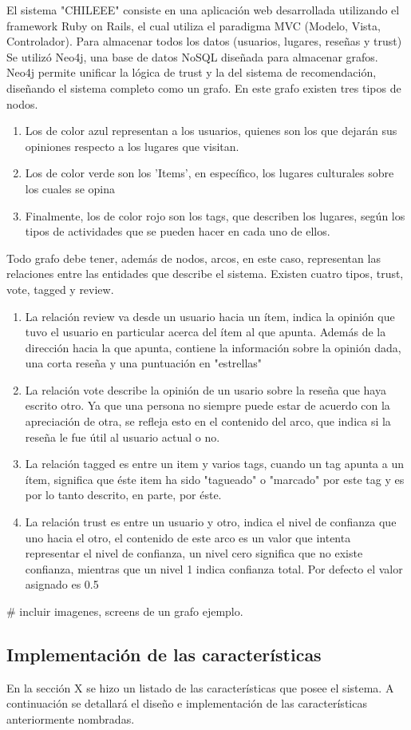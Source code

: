 El sistema "CHILEEE" consiste en una aplicación web desarrollada utilizando el framework Ruby on Rails, el cual utiliza el paradigma MVC (Modelo, Vista, Controlador). Para almacenar todos los datos (usuarios, lugares, reseñas y trust) Se utilizó Neo4j, una base de datos NoSQL diseñada para almacenar grafos. Neo4j permite unificar la lógica de trust y la del sistema de recomendación, diseñando el sistema completo como un grafo. En este grafo existen tres tipos de nodos.

\begin{enumerate}
\item{Los de color azul representan a los usuarios, quienes son los que dejarán sus opiniones respecto a los lugares que visitan.}
\item{Los de color verde son los 'Items', en específico, los lugares culturales sobre los cuales se opina}
\item{Finalmente, los de color rojo son los tags, que describen los lugares, según los tipos de actividades que se pueden hacer en cada uno de ellos.}
\end{enumerate} 
Todo grafo debe tener, además de nodos, arcos, en este caso, representan las relaciones entre las entidades que describe el sistema. Existen cuatro tipos, trust, vote, tagged y review.
\begin{enumerate}
\item{La relación review va desde un usuario hacia un ítem, indica la opinión que tuvo el usuario en particular acerca del ítem al que apunta. Además de la dirección hacia la que apunta, contiene la información sobre la opinión dada, una corta reseña y una puntuación en "estrellas"}
\item{La relación vote describe la opinión de un usario sobre la reseña que haya escrito otro. Ya que una persona no siempre puede estar de acuerdo con la apreciación de otra, se refleja esto en el contenido del arco, que indica si la reseña le fue útil al usuario actual o no.}
\item{La relación tagged es entre un item y varios tags, cuando un tag apunta a un ítem, significa que éste item ha sido "tagueado" o "marcado" por este tag y es por lo tanto descrito, en parte, por éste. }
\item{La relación trust es entre un usuario y otro, indica el nivel de confianza que uno hacia el otro, el contenido de este arco es un valor que intenta representar el nivel de confianza, un nivel cero significa que no existe confianza, mientras que un nivel 1 indica confianza total. Por defecto el valor asignado es 0.5}
\end{enumerate}

# incluir imagenes,  screens de un grafo ejemplo.

\subsection{Implementación de las características}

En la sección X se hizo un listado de las características que posee el sistema. A continuación se detallará el diseño e implementación de las características anteriormente nombradas. 

